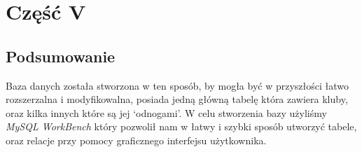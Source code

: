 \documentclass[12pt,a4paper]{article}
\begin{document}
    \newpage
    \section{Część V}
    \subsection{Podsumowanie}
    Baza danych została stworzona w ten sposób, by mogła być w przyszłości łatwo rozszerzalna i modyfikowalna, posiada jedną główną tabelę która zawiera kluby, oraz kilka innych które są jej \lq{odnogami\rq}. W celu stworzenia bazy użyliśmy \textit{MySQL WorkBench} który pozwolił nam w łatwy i szybki sposób utworzyć tabele, oraz relacje przy pomocy graficznego interfejsu użytkownika.
    
    
\end{document}
